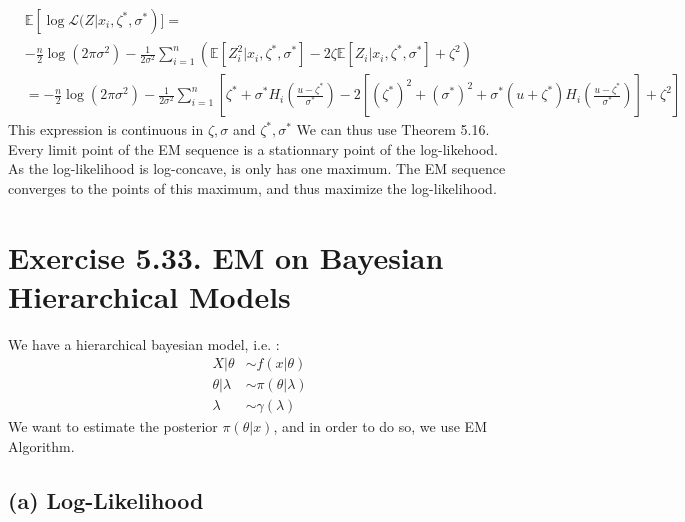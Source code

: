 \documentclass{article}
\begin{document}
\begin{align*}
   &  \mathbb{E}\left [ \log \mathcal{L}( Z|x_i,  \zeta^*, \sigma^*\right) ] = \\
   & - \frac{n}{2} \log (2\pi \sigma^2) -\frac{1}{2\sigma^2} 
   \sum_{i=1}^n ( \mathbb{E} [ Z_i^2|x_i ,  \zeta^*, \sigma^*]
   - 2 \zeta \mathbb{E}  [ Z_i|x_i,  \zeta^*, \sigma^*] + \zeta^2 ) \\
   &= - \frac{n}{2} \log (2\pi \sigma^2) -\frac{1}{2\sigma^2} 
    \sum_{i=1}^n \left [
    \zeta^* + \sigma^* H_i\left (\frac{u-\zeta^*}{\sigma^*} \right) 
    -2 \left [ 
(\zeta^*)^2 
    + (\sigma^*)^2
    +\sigma^*(u+\zeta^*) H_i\left (  \frac{u-\zeta^*}{\sigma^*}   \right )
    \right ]
    + \zeta^2 \right ]
\end{align*}
This expression is continuous in $\zeta, \sigma $ and $\zeta^*, \sigma^*$
We can thus use Theorem 5.16. Every limit point of the EM sequence 
is a stationnary point of the log-likehood.
 As the log-likelihood is log-concave, is only has one maximum. The EM
 sequence converges to the points of this maximum, and thus maximize the 
 log-likelihood. 








\newpage
\section*{Exercise 5.33. EM on Bayesian Hierarchical Models}

We have a hierarchical bayesian model, i.e. :
\begin{align*}
    X|\theta &\sim f(x|\theta) \\
    \theta |\lambda &\sim \pi(\theta | \lambda) \\
    \lambda &\sim \gamma(\lambda)
\end{align*}
We want to estimate the posterior $\pi(\theta|x)$, and in order to do so, 
we use EM Algorithm. 
\subsection*{(a) Log-Likelihood}
\end{document}
